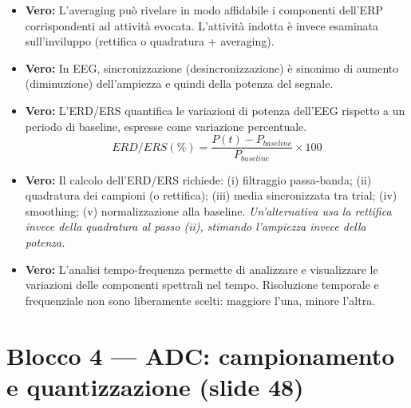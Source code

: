 \begin{itemize}
    \item \textbf{Vero:} L'averaging può rivelare in modo affidabile i componenti dell'ERP corrispondenti ad attività evocata. L'attività indotta è invece esaminata sull'inviluppo (rettifica o quadratura + averaging).
    
    \item \textbf{Vero:} In EEG, sincronizzazione (desincronizzazione) è sinonimo di aumento (diminuzione) dell'ampiezza e quindi della potenza del segnale.
    
    \item \textbf{Vero:} L'ERD/ERS quantifica le variazioni di potenza dell'EEG rispetto a un periodo di baseline, espresse come variazione percentuale.
    \[
    ERD/ERS(\%) = \frac{P(t) - P_{baseline}}{P_{baseline}} \times 100
    \]
    
    \item \textbf{Vero:} Il calcolo dell'ERD/ERS richiede: (i) filtraggio passa-banda; (ii) quadratura dei campioni (o rettifica); (iii) media sincronizzata tra trial; (iv) smoothing; (v) normalizzazione alla baseline.
    \textit{Un'alternativa usa la rettifica invece della quadratura al passo (ii), stimando l'ampiezza invece della potenza.}
    
    \item \textbf{Vero:} L'analisi tempo-frequenza permette di analizzare e visualizzare le variazioni delle componenti spettrali nel tempo. Risoluzione temporale e frequenziale non sono liberamente scelti: maggiore l'una, minore l'altra.
\end{itemize}

\section{Blocco 4 — ADC: campionamento e quantizzazione (slide 48)}

